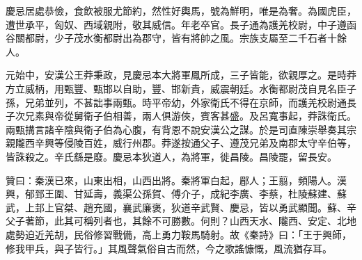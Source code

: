 \begin{pinyinscope}
慶忌居處恭儉，食飲被服尤節約，然性好輿馬，號為鮮明，唯是為奢。為國虎臣，遭世承平，匈奴、西域親附，敬其威信。年老卒官。長子通為護羌校尉，中子遵函谷關都尉，少子茂水衡都尉出為郡守，皆有將帥之風。宗族支屬至二千石者十餘人。

元始中，安漢公王莽秉政，見慶忌本大將軍鳳所成，三子皆能，欲親厚之。是時莽方立威柄，用甄豐、甄邯以自助，豐、邯新貴，威震朝廷。水衡都尉茂自見名臣子孫，兄弟並列，不甚詘事兩甄。時平帝幼，外家衛氏不得在京師，而護羌校尉通長子次兄素與帝從舅衛子伯相善，兩人俱游俠，賓客甚盛。及呂寬事起，莽誅衛氏。兩甄搆言諸辛陰與衛子伯為心腹，有背恩不說安漢公之謀。於是司直陳崇舉奏其宗親隴西辛興等侵陵百姓，威行州郡。莽遂按通父子、遵茂兄弟及南郡太守辛伯等，皆誅殺之。辛氏繇是廢。慶忌本狄道人，為將軍，徙昌陵。昌陵罷，留長安。

贊曰：秦漢已來，山東出相，山西出將。秦將軍白起，郿人；王翦，頻陽人。漢興，郁郅王圍、甘延壽，義渠公孫賀、傅介子，成紀李廣、李蔡，杜陵蘇建、蘇武，上邽上官桀、趙充國，襄武廉褒，狄道辛武賢、慶忌，皆以勇武顯聞。蘇、辛父子著節，此其可稱列者也，其餘不可勝數。何則？山西天水、隴西、安定、北地處勢迫近羌胡，民俗修習戰備，高上勇力鞍馬騎射。故《秦詩》曰：「王于興師，修我甲兵，與子皆行。」其風聲氣俗自古而然，今之歌謠慷慨，風流猶存耳。


\end{pinyinscope}